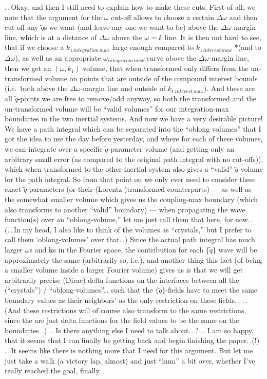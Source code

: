 \documentclass{report}
\begin{document}
.\,.\,Okay, and then I still need to explain how to make these cuts. First of all, we note that the argument for the $\omega$ cut-off allows to choose a certain $\Delta\omega$ and then cut off any $\tilde q$s we want (and leave any one we want to be) above the $\Delta\omega$-margin line, which is at a distance of $\Delta\omega$ above the $\omega=k$ line. It is then not hard to see, that if we choose a $k_{1\, integration\, max}$ large enough compared to $k_{1\, interest\, max}$ *(and to $\Delta\omega$), as well as an appropriate $\omega_{integration\, max}$-curve above the $\Delta\omega$-margin line, then we get an $(\omega, k_1)$ volume, that when transformed only differs from the un-transformed volume on points that are outside of the compound interest bounds (i.e.\ both above the $\Delta\omega$-margin line and outside of $k_{1\, interest\, max}$). And these are all $\tilde q$-points we are free to remove/add anyway, so both the transformed and the un-transformed volume will be ``valid volumes'' for our integration-max boundaries in the two inertial systems. And now we have a very desirable picture! We have a path integral which can be separated into the ``oblong volumes'' that I got the idea to use the day before yesterday, and where for each of these volumes, we can integrate over a specific $\tilde q$-parameter volume (and getting only an arbitrary small error (as compared to the original path integral with no cut-offs)), which when transformed to the other inertial system also gives a ``valid'' $\tilde q$-volume for the path integral. So from that point on we only ever need to consider these exact $\tilde q$-parameters (or their (Lorentz-)transformed counterparts) --- as well as the somewhat smaller volume which gives us the coupling-max boundary (which also transforms to another ``valid'' boundary) --- when propagating the wave function(s) over an ``oblong-volume,'' let me just call them that here, for now.\,. (.\,.\,In my head, I also like to think of the volumes as ``crystals,'' but I prefer to call them `oblong-volumes' over that.\,.) Since the actual path integral has much larger $\omega$s and $\boldsymbol{k}$s in the Fourier space, the contribution for each $\{\tilde q\}$ wave will be approximately the same (arbitrarily so, i.e.), and another thing this fact (of being a smaller volume inside a larger Fourier volume) gives us is that we will get arbitrarily precise (Dirac) delta functions on the interfaces between all the (``crystals'') / ``oblong-volumes''.\,. such that the $\{\tilde q \}$-fields have to meet the same boundary values as their neighbors' as the only restriction on these fields.\,. %
.\,.\,(And these restrictions will of course also transform to the same restrictions, since the are just delta functions for the field values to be the same on the boundaries.\,.) .\,.\,Is there anything else I need to talk about.\,.\,? .\,.\,I am so happy, that it seems that I can finally be getting back and begin finishing the paper.\,.(!) .\,.\,It seems like there is nothing more that I need for this argument. But let me just take a walk (a victory lap, almost) and just ``hum'' a bit over, whether I've really reached the goal, finally.\,. %
\end{document}
